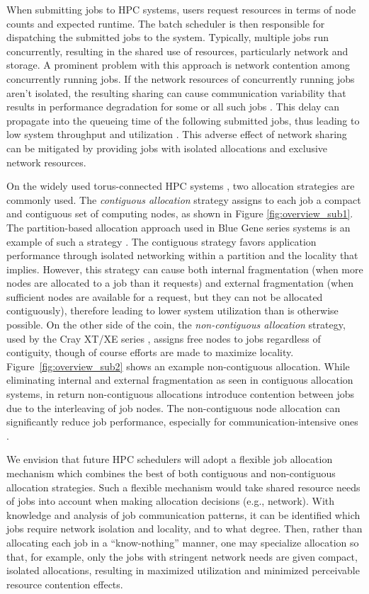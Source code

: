 \documentclass[conference]{IEEEtran}
\begin{document}
When submitting jobs to HPC systems, users request resources in terms of node counts and expected runtime. The batch scheduler is then responsible for dispatching the submitted jobs to the system. Typically, multiple jobs run concurrently, resulting in the shared use of resources, particularly network and storage. A prominent problem with this approach is network contention among concurrently running jobs. If the network resources of concurrently running jobs aren't isolated, the resulting sharing can cause communication variability that results in performance degradation for some or all such jobs \cite{abhinav-sc13}. This delay can propagate into the queueing time of the following submitted jobs, thus leading to low system throughput and utilization \cite{jose-ipdps15}. This adverse effect of network sharing can be mitigated by providing jobs with isolated allocations and exclusive network resources.

On the widely used torus-connected HPC systems \cite{bgq,tofu,titan}, two allocation strategies are commonly used. The \emph{contiguous allocation} strategy assigns to each job a compact and contiguous set of computing nodes, as shown in Figure \ref{fig:overview_sub1}. The partition-based allocation approach used in Blue Gene series systems is an example of such a strategy \cite{bgloverview}. The contiguous strategy favors application performance through isolated networking within a partition and the locality that implies. However, this strategy can cause both internal fragmentation (when more nodes are allocated to a job than it requests) and external fragmentation (when sufficient nodes are available for a request, but they can not be allocated contiguously), therefore leading to lower system utilization than is otherwise possible. On the other side of the coin, the \emph{non-contiguous allocation} strategy, used by the Cray XT/XE series \cite{carl-cug}, assigns free nodes to jobs regardless of contiguity, though of course efforts are made to maximize locality. Figure~\ref{fig:overview_sub2} shows an example non-contiguous allocation. While eliminating internal and external fragmentation as seen in contiguous allocation systems, in return non-contiguous allocations introduce contention between jobs due to the interleaving of job nodes. The non-contiguous node allocation can significantly reduce job performance, especially for communication-intensive ones \cite{abhinav-sc13}.

We envision that future HPC schedulers will adopt a flexible job allocation mechanism which combines the best of both contiguous and non-contiguous allocation strategies. Such a flexible mechanism would take shared resource needs of jobs into account when making allocation decisions (e.g., network). With knowledge and analysis of job communication patterns, it can be identified which jobs require network isolation and locality, and to what degree. Then, rather than allocating each job in a ``know-nothing'' manner, one may specialize allocation so that, for example, only the jobs with stringent network needs are given compact, isolated allocations, resulting in maximized utilization and minimized perceivable resource contention effects.
\end{document}
